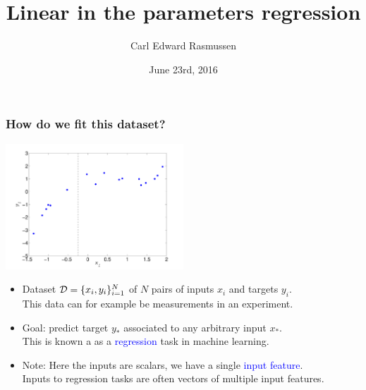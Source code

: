 \documentclass[10pt]{beamer}
\title{Linear in the parameters regression}
\author{Carl Edward Rasmussen}
\date{June 23rd, 2016}
\newcommand{\Blue}{\textcolor{blue}}
\begin{document}
\begin{frame}
\titlepage
\end{frame}

\begin{frame}
\frametitle{How do we fit this dataset?}

\centerline{\includegraphics[width=0.5\textwidth]{toy_data.pdf}}

\vfill

\begin{itemize}
\item Dataset ${\cal D}=\{x_i,y_i\}_{i=1}^N$ of $N$ pairs of inputs 
$x_i$ and  targets $y_i$.\\ This data can for example be
measurements in an experiment.
\item Goal: predict target $y_*$ associated to any arbitrary input 
$x_*$.\\ This is known a as a \Blue{regression} task in machine learning.
\item Note: Here the inputs are scalars, we have a single \Blue{input feature}.\\ 
Inputs to regression tasks are often vectors of multiple input features.
\end{itemize}
\end{frame}
\end{document}
